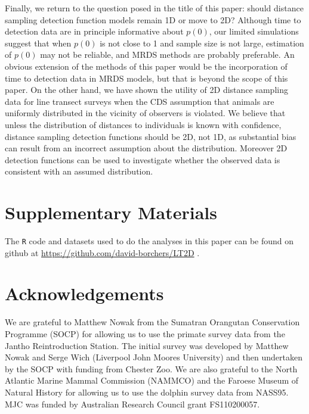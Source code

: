 \documentclass[useAMS,usenatbib,referee]{biom}
\begin{document}
Finally, we return to the question posed in the title of this paper: should distance sampling detection function models remain 1D or move to 2D? %
Although time to detection data are in principle informative about $p(0)$, our limited simulations suggest that when $p(0)$ is not close to 1 and sample size is not large, estimation of $p(0)$ may not be reliable, and MRDS methods are probably preferable. An obvious extension of the methods of this paper would be the incorporation of time to detection data in MRDS models, but that is beyond the scope of this paper. On the other hand, we have shown the utility of 2D distance sampling data for line transect surveys when the CDS assumption that animals are uniformly distributed in the vicinity of observers is violated. We believe that unless the distribution of distances to individuals is known with confidence, distance sampling detection functions should be 2D, not 1D, as substantial bias can result from an incorrect assumption about the distribution. Moreover 2D detection functions can be used to investigate whether the observed data is consistent with an assumed distribution.  %

\section*{Supplementary Materials}

The \texttt{R} code and datasets used to do the analyses in this paper can be found on github at \href{https://github.com/david-borchers/LT2D}{https://github.com/david-borchers/LT2D} .

\section*{Acknowledgements}
We are grateful to Matthew Nowak from the Sumatran Orangutan Conservation Programme (SOCP) for allowing us to use the primate survey data from the Jantho Reintroduction Station. The initial survey was developed by Matthew Nowak and Serge Wich (Liverpool John Moores University) and then undertaken by the SOCP with funding from Chester Zoo. We are also grateful to the North Atlantic Marine Mammal Commission (NAMMCO) and the Faroese Museum of Natural History for allowing us to use the dolphin survey data from NASS95. MJC was funded by Australian Research Council grant FS110200057.
\end{document}
